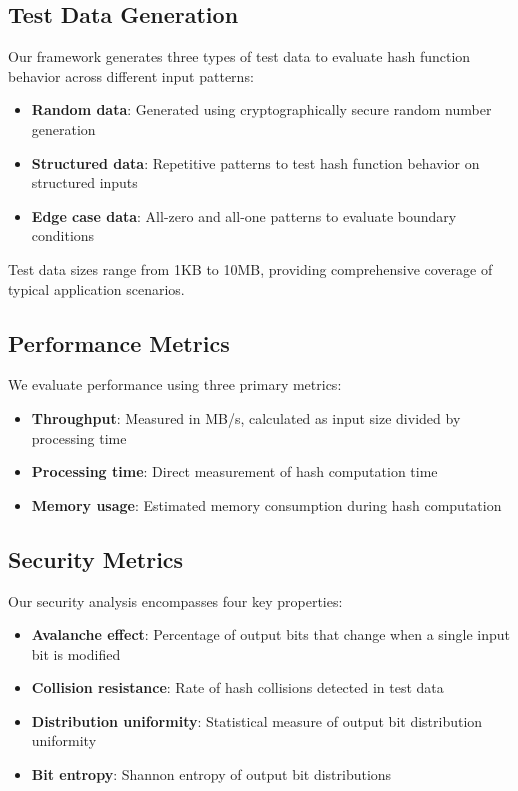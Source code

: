 \documentclass{article}
\begin{document}
\subsection{Test Data Generation}

Our framework generates three types of test data to evaluate hash function behavior across different input patterns:

\begin{itemize}
\item \textbf{Random data}: Generated using cryptographically secure random number generation
\item \textbf{Structured data}: Repetitive patterns to test hash function behavior on structured inputs
\item \textbf{Edge case data}: All-zero and all-one patterns to evaluate boundary conditions
\end{itemize}

Test data sizes range from 1KB to 10MB, providing comprehensive coverage of typical application scenarios.

\subsection{Performance Metrics}

We evaluate performance using three primary metrics:

\begin{itemize}
\item \textbf{Throughput}: Measured in MB/s, calculated as input size divided by processing time
\item \textbf{Processing time}: Direct measurement of hash computation time
\item \textbf{Memory usage}: Estimated memory consumption during hash computation
\end{itemize}

\subsection{Security Metrics}

Our security analysis encompasses four key properties:

\begin{itemize}
\item \textbf{Avalanche effect}: Percentage of output bits that change when a single input bit is modified
\item \textbf{Collision resistance}: Rate of hash collisions detected in test data
\item \textbf{Distribution uniformity}: Statistical measure of output bit distribution uniformity
\item \textbf{Bit entropy}: Shannon entropy of output bit distributions
\end{itemize}
\end{document}

